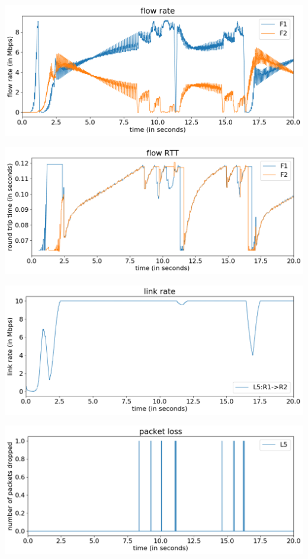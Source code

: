 \documentclass{article}
\begin{document}
\includegraphics[width = \textwidth]{"test_case4 flow rate"}

\includegraphics[width = \textwidth]{"test_case4 flow RTT"}

\includegraphics[width = \textwidth]{"test_case4 link rate"}

\includegraphics[width = \textwidth]{"test_case4 packet loss"}
\end{document}
